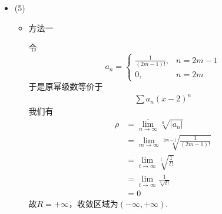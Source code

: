 \documentclass{article}
\begin{document}
\begin{itemize}
        $x = 4$时，$\sum \frac{(n!)^2}{(2n)!}4^n$。
        \begin{align*}
          \lim\limits_{n\to\infty} \frac{(n!)^2}{(2n)!}4^n
           & = \lim\limits_{n\to\infty} \frac{(n!)^2 \cdot 2^n \cdot 2^n}{(2n)!}                                     \\
           & = \lim\limits_{n\to\infty} \frac{n! \cdot 2^n \cdot n! \cdot 2^n}{(2n)!}                                \\
           & = \lim\limits_{n\to\infty} \frac{(2n(2n - 2)\cdot 2) \cdot (2n(2n - 2)\cdot 2)}{2n(2n-1)(2n-2) \cdot 1} \\
           & = \lim\limits_{n\to\infty} \frac{2n(2n - 2)\cdot 2}{(2n-1)(2n-3) \cdot 1}                               \\
           & = \lim\limits_{n\to\infty} \frac{2n}{2n - 1} \frac{2n - 2}{2n - 3} \cdot \frac{2}{1}                    \\
           & \geq 1
        \end{align*}
        由级数收敛的柯西准则的推论可知，该级数发散；

        同理$x = -4$时，级数也发散。

        故收敛区域为$(-4, 4)$.

  \item (5)

        \begin{itemize}
          \item 方法一

                令
                \begin{equation*}
                  a_n =
                  \begin{cases}
                    \frac{1}{(2m - 1)!}, & n = 2m - 1 \\
                    0,                   & n = 2m
                  \end{cases}
                \end{equation*}
                于是原幂级数等价于
                \begin{align*}
                  \sum a_n (x - 2)^n
                \end{align*}
                我们有
                \begin{align*}
                  \rho
                   & = \overline{\lim\limits_{n \to \infty}} \sqrt[n]{|a_n|}         \\
                   & = \lim\limits_{m \to \infty} \sqrt[2m - 1]{\frac{1}{(2m - 1)!}} \\
                   & = \lim\limits_{t \to \infty} \sqrt[t]{\frac{1}{t!}}             \\
                   & = \lim\limits_{t \to \infty} \frac{1} {\sqrt[t]{t!}}            \\
                   & = 0
                \end{align*}
                故$R = +\infty$，收敛区域为$(-\infty, +\infty)$.


\end{itemize}
\end{itemize}
\end{document}

